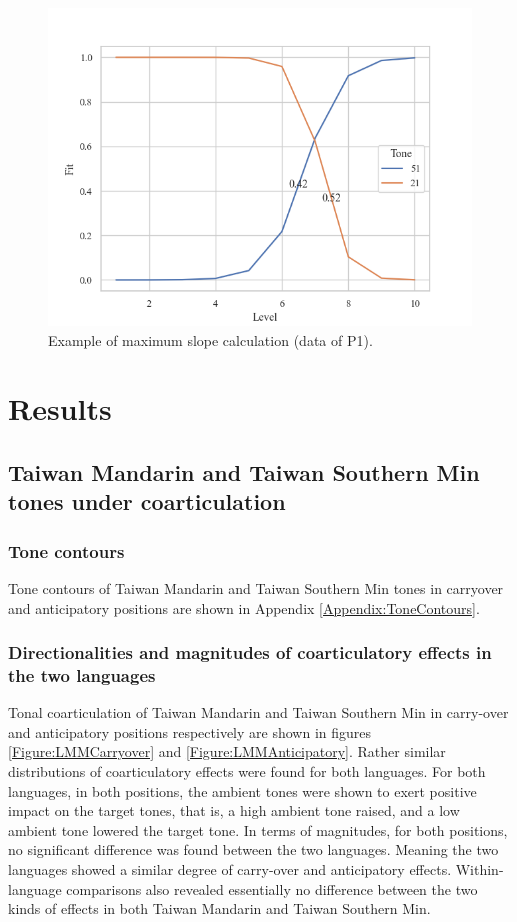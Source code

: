 \documentclass[12pt]{report}
\begin{document}
\begin{CJK}{UTF8}{bsmi}
\begin{figure}[h]
\centering
\includegraphics[width=\textwidth]{Figures/E3/ProcessedExample.png}
\caption{Example of maximum slope calculation (data of P1).}
\label{Figure:E3ProcessedExample}
\end{figure}

\pagebreak
\chapter{Results}
\section{Taiwan Mandarin and Taiwan Southern Min tones under coarticulation}

\subsection{Tone contours}

Tone contours of Taiwan Mandarin and Taiwan Southern Min tones in carryover and anticipatory positions are shown in Appendix \ref{Appendix:ToneContours}.

\subsection{Directionalities and magnitudes of coarticulatory effects in the two languages}

Tonal coarticulation of Taiwan Mandarin and Taiwan Southern Min in carry-over and anticipatory positions respectively are shown in figures \ref{Figure:LMMCarryover} and \ref{Figure:LMMAnticipatory}. Rather similar distributions of coarticulatory effects were found for both languages. For both languages, in both positions, the ambient tones were shown to exert positive impact on the target tones, that is, a high ambient tone raised, and a low ambient tone lowered the target tone. In terms of magnitudes, for both positions, no significant difference was found between the two languages. Meaning the two languages showed a similar degree of carry-over and anticipatory effects. Within-language comparisons also revealed essentially no difference between the two kinds of effects in both Taiwan Mandarin and Taiwan Southern Min.


\end{CJK}
\end{document}
